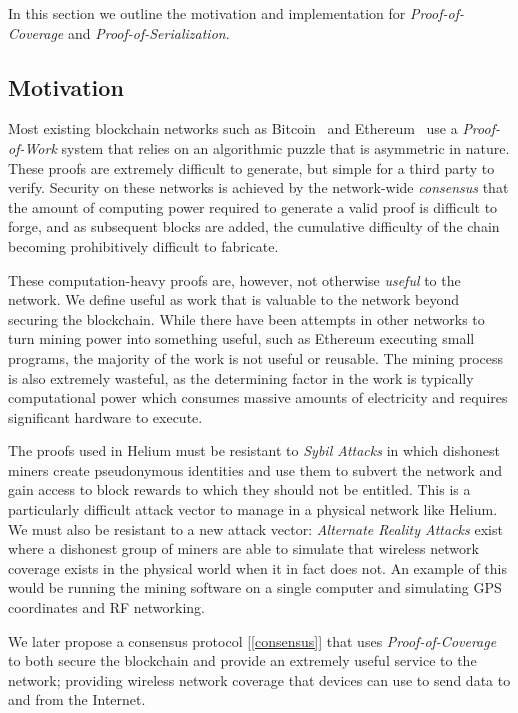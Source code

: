 \documentclass[UTF8, 10pt, nonatbib, nocopyrightspace, reprint]{sigplanconf}
\newcommand{\secref}[1]{[\autoref{#1}]}
\begin{document}
In this section we outline the motivation and implementation for \emph{Proof-of-Coverage} and \emph{Proof-of-Serialization}.

\subsection{Motivation}

Most existing blockchain networks such as Bitcoin~\cite{bitcoin} and Ethereum~\cite{ethereum} use a \emph{Proof-of-Work} system that relies on an algorithmic puzzle that is asymmetric in nature. These proofs are extremely difficult to generate, but simple for a third party to verify. Security on these networks is achieved by the network-wide \emph{consensus} that the amount of computing power required to generate a valid proof is difficult to forge, and as subsequent blocks are added, the cumulative difficulty of the chain becoming prohibitively difficult to fabricate.

These computation-heavy proofs are, however, not otherwise \emph{useful} to the network. We define useful as work that is valuable to the network beyond securing the blockchain. While there have been attempts in other networks to turn mining power into something useful, such as Ethereum executing small programs, the majority of the work is not useful or reusable. The mining process is also extremely wasteful, as the determining factor in the work is typically computational power which consumes massive amounts of electricity and requires significant hardware to execute.

The proofs used in Helium must be resistant to \emph{Sybil Attacks} in which dishonest miners create pseudonymous identities and use them to subvert the network and gain access to block rewards to which they should not be entitled. This is a particularly difficult attack vector to manage in a physical network like Helium. We must also be resistant to a new attack vector: \emph{Alternate Reality Attacks} exist where a dishonest group of miners are able to simulate that wireless network coverage exists in the physical world when it in fact does not. An example of this would be running the mining software on a single computer and simulating GPS coordinates and RF networking.

We later propose a consensus protocol \secref{consensus} that uses \emph{Proof-of-Coverage} to both secure the blockchain and provide an extremely useful service to the network; providing wireless network coverage that devices can use to send data to and from the Internet.
\end{document}
